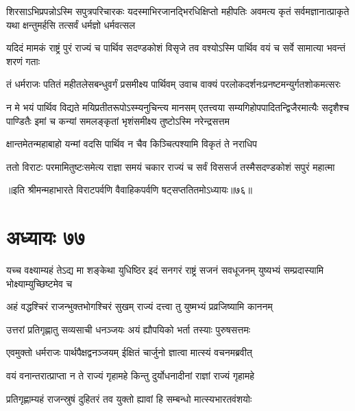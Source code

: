 \onelineshloka
{शिरसाऽभिप्रपन्नोऽस्मि सपुत्रपरिचारकः}
\threelineshloka
{यदस्माभिरजानद्भिरधिक्षिप्तो महीपतिः}
{अवमत्य कृतं सर्वमज्ञानात्प्राकृते यथा}
{क्षन्तुमर्हसि तत्सर्वं धर्मज्ञो धर्मवत्सल}


\threelineshloka
{यदिदं मामकं राष्ट्रं पुरं राज्यं च पार्थिव}
{सदण्डकोशं विसृजे तव वश्योऽस्मि पार्थिव}
{वयं च सर्वे सामात्या भवन्तं शरणं गताः}



\twolineshloka
{तं धर्मराजः पतितं महीतलेसबन्धुवर्गं प्रसमीक्ष्य पार्थिवम्}
{उवाच वाक्यं परलोकदर्शनःप्रनष्टमन्युर्गतशोकमत्सरः}


\threelineshloka
{न मे भयं पार्थिव विद्यते मयिप्रतीतरूपोऽस्म्यनुचिन्त्य मानसम्}
{एतत्त्वया सम्यगिहोपपादितन्द्विजैरमात्यैः सदृशैश्च पाण्डितैः}
{इमां च कन्यां समलङ्कृतां भृशंसमीक्ष्य तुष्टोऽस्मि नरेन्द्रसत्तम}


\twolineshloka
{क्षान्तमेतन्महाबाहो यन्मां वदसि पार्थिव}
{न चैव किञ्चित्पश्यामि विकृतं ते नराधिप}



\twolineshloka
{ततो विराटः परमामितुष्टःसमेत्य राज्ञा समयं चकार}
{राज्यं च सर्वं विससर्ज तस्मैसदण्डकोशं सपुरं महात्मा}

॥इति श्रीमन्महाभारते विराटपर्वणि वैवाहिकपर्वणि षट्सप्ततितमोऽध्यायः॥७६॥

\chapter{अध्यायः ७७}

\threelineshloka
{यच्च वक्ष्याम्यहं तेऽद्य मा शङ्केथा युधिष्ठिर}
{इदं सनगरं राष्ट्रं सजनं सवधूजनम्}
{युष्यभ्यं सम्प्रदास्यामि भोक्ष्याम्युच्छिष्टमेव च}


\twolineshloka
{अहं वद्धश्चिरं राजन्भुक्तभोगश्चिरं सुखम्}
{राज्यं दत्त्वा तु युष्मभ्यं प्रव्रजिष्यामि काननम्}


\twolineshloka
{उत्तरां प्रतिगृह्णातु सव्यसाची धनञ्जयः}
{अयं ह्यौपयिको भर्ता तस्याः पुरुषसत्तमः}



\twolineshloka
{एवमुक्तो धर्मराजः पार्थपैक्षद्वनञ्जयम्}
{ईक्षितं चार्जुनो ज्ञात्वा मात्स्यं वचनमब्रवीत्}


\twolineshloka
{वयं वनान्तरात्प्राप्ता न ते राज्यं गृहामहे}
{किन्तु दुर्योधनादीनां राज्ञां राज्यं गृहामहे}


\twolineshloka
{प्रतिगृह्णाम्यहं राजन्स्रुषं दुहितरं तव}
{युक्तो ह्यावां हि सम्बन्धो मात्स्यभारतवंशयोः}

